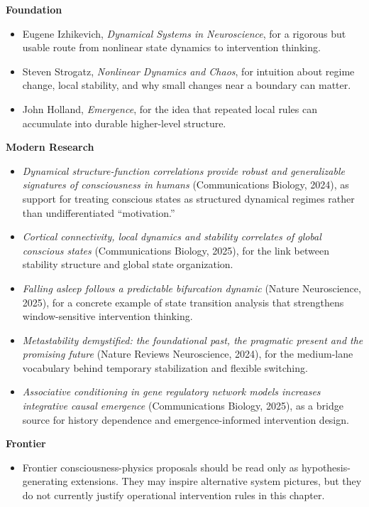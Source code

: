 \begin{readingbox}
\textbf{Foundation}
\begin{itemize}[nosep]
  \item Eugene Izhikevich, \emph{Dynamical Systems in Neuroscience}, for a
        rigorous but usable route from nonlinear state dynamics to intervention
        thinking.
  \item Steven Strogatz, \emph{Nonlinear Dynamics and Chaos}, for intuition
        about regime change, local stability, and why small changes near a
        boundary can matter.
  \item John Holland, \emph{Emergence}, for the idea that repeated local rules
        can accumulate into durable higher-level structure.
\end{itemize}
\textbf{Modern Research}
\begin{itemize}[nosep]
  \item \emph{Dynamical structure-function correlations provide robust and
        generalizable signatures of consciousness in humans} (Communications
        Biology, 2024), as support for treating conscious states as structured
        dynamical regimes rather than undifferentiated ``motivation.''
  \item \emph{Cortical connectivity, local dynamics and stability correlates of
        global conscious states} (Communications Biology, 2025), for the link
        between stability structure and global state organization.
  \item \emph{Falling asleep follows a predictable bifurcation dynamic}
        (Nature Neuroscience, 2025), for a concrete example of state transition
        analysis that strengthens window-sensitive intervention thinking.
  \item \emph{Metastability demystified: the foundational past, the pragmatic
        present and the promising future} (Nature Reviews Neuroscience, 2024),
        for the medium-lane vocabulary behind temporary stabilization and
        flexible switching.
  \item \emph{Associative conditioning in gene regulatory network models
        increases integrative causal emergence} (Communications Biology, 2025),
        as a bridge source for history dependence and emergence-informed
        intervention design.
\end{itemize}
\textbf{Frontier}
\begin{itemize}[nosep]
  \item Frontier consciousness-physics proposals should be read only as
        hypothesis-generating extensions. They may inspire alternative system
        pictures, but they do not currently justify operational intervention
        rules in this chapter.
\end{itemize}
\end{readingbox}

